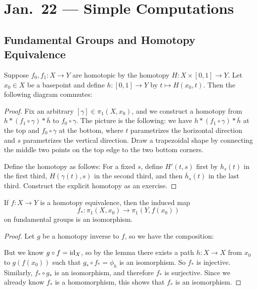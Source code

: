 \chapter{Jan.~22 --- Simple Computations}

\section{Fundamental Groups and Homotopy Equivalence}
\begin{lemma}
  Suppose $f_0, f_1 : X \to Y$ are homotopic by
  the homotopy $H : X \times [0, 1] \to Y$. Let
  $x_0 \in X$ be a basepoint and define
  $h : [0, 1] \to Y$ by $t \mapsto H(x_0, t)$. Then
  the following diagram commutes:
  \begin{center}
  \end{center}
\end{lemma}

\begin{proof}
  Fix an arbitrary $[\gamma] \in \pi_1(X, x_0)$, and we construct a
  homotopy from $h * (f_1 \circ \gamma) * \overline{h}$
  to $f_0 \circ \gamma$. The picture is the following:
  we have $h * (f_1 \circ \gamma) * \overline{h}$
  at the top and $f_0 \circ \gamma$ at the bottom,
  where $t$ parametrizes the horizontal direction and
  $s$ parametrizes the vertical direction.
  Draw a trapezoidal shape by connecting the
  middle two points on the top edge to the two bottom
  corners.

  Define the homotopy
  as follows: For a fixed $s$, define
  $H'(t, s)$ first by $h_s(t)$ in the first third, $H(\gamma(t), s)$ in the second third,
  and then $\overline{h}_s(t)$ in the last third.
  Construct the explicit homotopy as an exercise.
\end{proof}

\begin{theorem}
  If $f : X \to Y$ is a homotopy equivalence, then
  the induced map
  \[f_* : \pi_1(X, x_0) \to \pi_1(Y, f(x_0))\]
  on fundamental groups is an isomorphism.
\end{theorem}

\begin{proof}
  Let $g$ be a homotopy inverse to $f$, so we
  have the composition:
  \begin{center}
  \end{center}
  But we know $g \circ f = \operatorname{id}_X$, so by the lemma
  there exists a path $h : X \to X$ from $x_0$
  to $g(f(x_0))$ such that $g_* \circ f_* = \phi_h$
  is an isomorphism. So $f_*$ is injective.
  Similarly, $f_* \circ g_*$ is an isomorphism,
  and therefore $f_*$ is surjective. Since
  we already know $f_*$ is a homomorphism, this
  shows that $f_*$ is an isomorphism.
\end{proof}

